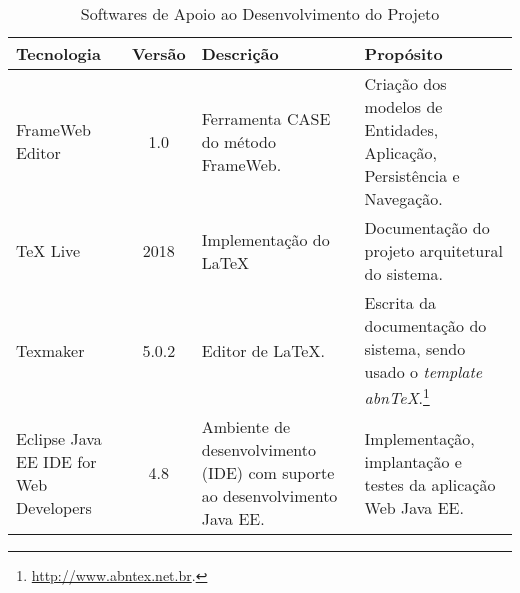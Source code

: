 \begin{table}[h]
	\centering	
	\vspace{0.5cm}
	\caption{Softwares de Apoio ao Desenvolvimento do Projeto}	
	\label{tabela-software}
	\begin{tabular}{|p{3cm}|c|p{5cm}|p{6cm}|}  \hline 
	
 		\rowcolor[rgb]{0.8,0.8,0.8} Tecnologia & Versão & Descrição & Propósito \\\hline 
 		 
		FrameWeb Editor & 1.0 & Ferramenta CASE do método FrameWeb. & Criação dos modelos de Entidades, Aplicação, Persistência e Navegação. \\\hline

		TeX Live  & 2018 & Implementação do \LaTeX & Documentação do projeto arquitetural do sistema. \\\hline       
		
		Texmaker & 5.0.2 & Editor de \LaTeX. &  Escrita da documentação do sistema, sendo usado o \textit{template} \textit{abnTeX}.\footnote{\url{http://www.abntex.net.br}.} \\\hline    

		Eclipse Java EE IDE for Web Developers & 4.8 & Ambiente de desenvolvimento (IDE) com suporte ao desenvolvimento Java EE. & Implementação, implantação e testes da aplicação Web Java EE. \\\hline 
		
	\end{tabular}
\end{table}

